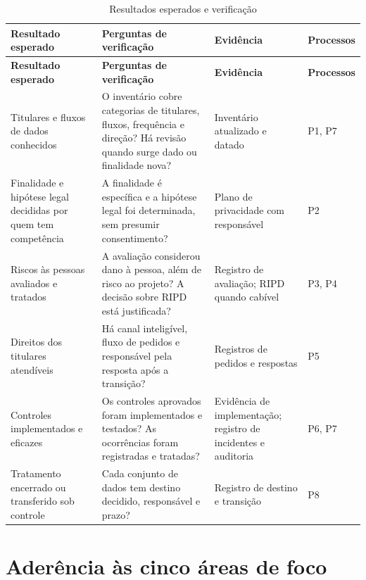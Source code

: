 \documentclass[11pt,a4paper]{article}
\makeatletter
\newcommand{\refnum}[1]{\csname refnum@#1\endcsname}
\newcommand{\cit}[1]{[\refnum{#1}]}
\newcommand{\SingleSpacing}{}
\newcommand{\fontetab}[1]{\par\vspace{3pt}{\small\noindent Fonte: #1\par}}
\makeatother
\begin{document}
\begingroup\SingleSpacing\footnotesize
\begin{longtable}{@{}>{\raggedright\arraybackslash}p{}>{\raggedright\arraybackslash}p{}>{\raggedright\arraybackslash}p{}>{\raggedright\arraybackslash}p{}@{}}
\caption{Resultados esperados e verificação}\label{tab:t7}\\
\toprule
\textbf{Resultado esperado} & \textbf{Perguntas de verificação} & \textbf{Evidência} & \textbf{Processos}\\
\midrule
\endfirsthead
\toprule
\textbf{Resultado esperado} & \textbf{Perguntas de verificação} & \textbf{Evidência} & \textbf{Processos}\\
\midrule
\endhead
\bottomrule
\endfoot
\bottomrule
\endlastfoot
Titulares e fluxos de dados conhecidos & O inventário cobre categorias de titulares, fluxos, frequência e direção? Há revisão quando surge dado ou finalidade nova? & Inventário atualizado e datado & P1, P7\\[3pt]
Finalidade e hipótese legal decididas por quem tem competência & A finalidade é específica e a hipótese legal foi determinada, sem presumir consentimento? & Plano de privacidade com responsável & P2\\[3pt]
Riscos às pessoas avaliados e tratados & A avaliação considerou dano à pessoa, além de risco ao projeto? A decisão sobre RIPD está justificada? & Registro de avaliação; RIPD quando cabível & P3, P4\\[3pt]
Direitos dos titulares atendíveis & Há canal inteligível, fluxo de pedidos e responsável pela resposta após a transição? & Registros de pedidos e respostas & P5\\[3pt]
Controles implementados e eficazes & Os controles aprovados foram implementados e testados? As ocorrências foram registradas e tratadas? & Evidência de implementação; registro de incidentes e auditoria & P6, P7\\[3pt]
Tratamento encerrado ou transferido sob controle & Cada conjunto de dados tem destino decidido, responsável e prazo? & Registro de destino e transição & P8\\[3pt]
\end{longtable}
\endgroup
\fontetab{Elaborado pelos autores (2026), com base em \cit{pmi}.}

\section{Aderência às cinco áreas de foco}
\end{document}
